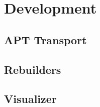 \documentclass[../Main/thesis.tex]{subfiles}
\begin{document}
\chapter{Development}\label{ch:development}
\section{APT Transport}\label{sec:apt_transport}
\section{Rebuilders}\label{sec:development_rebuilders}
\section{Visualizer}\label{sec:visualizer}
\blankpage
\end{document}
